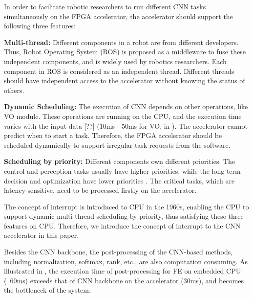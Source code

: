 In order to facilitate robotic researchers to run different CNN tasks simultaneously on the FPGA accelerator, the accelerator should support the following three features:

\textbf{Multi-thread:} Different components in a robot are from different developers. Thus, Robot Operating System (ROS) \cite{quigley2009ros} is proposed as a middleware to fuse these independent components, and is widely used by robotics researchers. Each component in ROS is considered as an independent thread. Different threads should have independent access to the accelerator without knowing the status of others.



\textbf{Dynamic Scheduling:} The execution of CNN depends on other operations, like VO module. 
These operations are running on the CPU, and the execution time varies with the input data [??] (10ms - 50ms for VO, in ). 
The accelerator cannot predict when to start a task. 
Therefore, the FPGA accelerator should be scheduled dynamically to support irregular task requests from the software.

\textbf{Scheduling by priority:} Different components own different priorities. The control and perception tasks usually have higher priorities, while the long-term decision and optimization have lower priorities \cite{RamsauerKLM17}. The critical tasks, which are latency-sensitive,  need to be processed firstly on the accelerator.

The concept of interrupt \cite{jen1974processor} is introduced to CPU in the 1960s, enabling the CPU to support dynamic multi-thread scheduling by priority, thus satisfying these three features on CPU. Therefore, we introduce the concept of interrupt to the CNN accelerator in this paper.

Besides the CNN backbone, the post-processing of the CNN-based methods, including normalization, softmax, rank, etc., are also computation consuming. As illustrated in , the execution time of post-processing for FE on embedded CPU (~60ms) exceeds that of CNN backbone on the accelerator (30ms), and becomes the bottleneck of the system.

